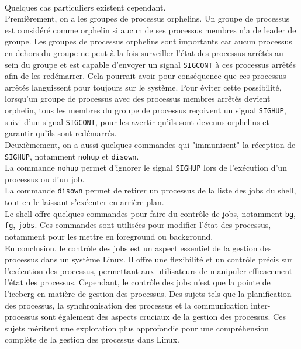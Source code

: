 \\
Quelques cas particuliers existent cependant.
\\ 
Premièrement, on a les groupes de processus orphelins. Un groupe de processus est considéré comme orphelin si aucun de ses processus membres n'a de leader de groupe. Les groupes de processus orphelins sont importants car aucun processus en dehors du groupe ne peut à la fois surveiller l'état des processus arrêtés au sein du groupe et est capable d'envoyer un signal \texttt{SIGCONT} à ces processus arrêtés afin de les redémarrer. Cela pourrait avoir pour conséquence que ces processus arrêtés languissent pour toujours sur le système. Pour éviter cette possibilité, lorsqu'un groupe de processus avec des processus membres arrêtés devient orphelin, tous les membres du groupe de processus reçoivent un signal \texttt{SIGHUP}, suivi d'un signal \texttt{SIGCONT}, pour les avertir qu'ils sont devenus orphelins et garantir qu'ils sont redémarrés.
\\ 
Deuxièmement, on a aussi quelques commandes qui "immunisent" la réception de \texttt{SIGHUP}, notamment \texttt{nohup} et \texttt{disown}.
\\ 
La commande \texttt{nohup} permet d'ignorer le signal \texttt{SIGHUP} lors de l'exécution d'un processus ou d'un job.
\\ 
La commande \texttt{disown} permet de retirer un processus de la liste des jobs du shell, tout en le laissant s'exécuter en arrière-plan.
\\ 
Le shell offre quelques commandes pour faire du contrôle de jobs, notamment \texttt{bg}, \texttt{fg}, \texttt{jobs}. Ces commandes sont utilisées pour modifier l'état des processus, notamment pour les mettre en foreground ou background.
\\
En conclusion, le contrôle des jobs est un aspect essentiel de la gestion des processus dans un système Linux. Il offre une flexibilité et un contrôle précis sur l'exécution des processus, permettant aux utilisateurs de manipuler efficacement l'état des processus. Cependant, le contrôle des jobs n'est que la pointe de l'iceberg en matière de gestion des processus. Des sujets tels que la planification des processus, la synchronisation des processus et la communication inter-processus sont également des aspects cruciaux de la gestion des processus. Ces sujets méritent une exploration plus approfondie pour une compréhension complète de la gestion des processus dans Linux.
\\

